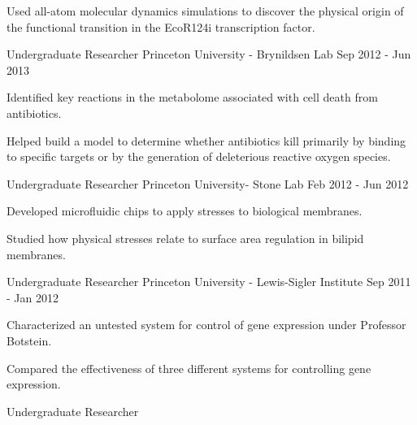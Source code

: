 \begin{cventries}
{      \begin{cvitems} %
        \item Used all-atom molecular dynamics simulations to discover the physical origin of the functional transition in the EcoR124i transcription factor.
      \end{cvitems}
    }
\ifoutdated
  \cventry
    {Undergraduate Researcher} %
    {Princeton University - Brynildsen Lab} %
    {} %
    {Sep 2012 - Jun 2013} %
    {
      \begin{cvitems} %
        \item Identified key reactions in the \ecoli metabolome associated with cell death from antibiotics.
        \item Helped build a model to determine whether antibiotics kill primarily by binding to specific targets or by the generation of deleterious reactive oxygen species.
      \end{cvitems}
    }
  \cventry
    {Undergraduate Researcher} %
    {Princeton University- Stone Lab} %
    {} %
    {Feb 2012 - Jun 2012} %
    {
      \begin{cvitems} %
        \item Developed microfluidic chips to apply stresses to biological membranes.
        \item Studied how physical stresses relate to surface area regulation in bilipid membranes.
      \end{cvitems}
    }
  \cventry
    {Undergraduate Researcher} %
    {Princeton University - Lewis-Sigler Institute} %
    {} %
    {Sep 2011 - Jan 2012} %
    {
      \begin{cvitems} %
        \item Characterized an untested system for control of gene expression under Professor Botstein.
        \item Compared the effectiveness of three different systems for controlling gene expression.
      \end{cvitems}
    }
  \cventry
    {Undergraduate Researcher} %

\end{cventries}
